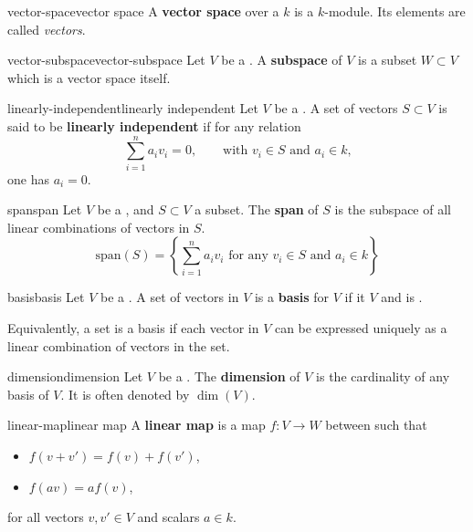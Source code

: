 \begin{topic}{vector-space}{vector space}
    A \textbf{vector space} over a  $k$ is a $k$-module. Its elements are called \textit{vectors}.
\end{topic}

\begin{topic}{vector-subspace}{vector-subspace}
    Let $V$ be a . A \textbf{subspace} of $V$ is a subset $W \subset V$ which is a vector space itself.
\end{topic}

\begin{topic}{linearly-independent}{linearly independent}
    Let $V$ be a . A set of vectors $S \subset V$ is said to be \textbf{linearly independent} if for any relation
    \[ \sum_{i = 1}^{n} a_i v_i = 0, \qquad \text{with $v_i \in S$ and $a_i \in k$,} \]
    one has $a_i = 0$.
\end{topic}

\begin{topic}{span}{span}
    Let $V$ be a , and $S \subset V$ a subset. The \textbf{span} of $S$ is the subspace of all linear combinations of vectors in $S$.
    \[ \text{span}(S) = \left\{ \sum_{i = 1}^{n} a_i v_i \text{ for any } v_i \in S \text{ and } a_i \in k \right\} \]
\end{topic}

\begin{topic}{basis}{basis}
    Let $V$ be a . A set of vectors in $V$ is a \textbf{basis} for $V$ if it  $V$ and is .
    
    Equivalently, a set is a basis if each vector in $V$ can be expressed uniquely as a linear combination of vectors in the set.
\end{topic}

\begin{topic}{dimension}{dimension}
    Let $V$ be a . The \textbf{dimension} of $V$ is the cardinality of any basis of $V$. It is often denoted by $\dim(V)$.
\end{topic}

\begin{topic}{linear-map}{linear map}
    A \textbf{linear map} is a map $f : V \to W$ between  such that
    \begin{itemize}
        \item $f(v + v') = f(v) + f(v')$,
        \item $f(av) = a f(v)$,
    \end{itemize}
    for all vectors $v, v' \in V$ and scalars $a \in k$.
\end{topic}


